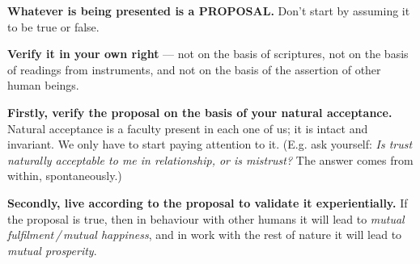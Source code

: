 \begin{abul}
\item \textbf{Whatever is being presented is a PROPOSAL.} Don't start by
      assuming it to be true or false.
\item \textbf{Verify it in your own right} --- not on the basis of scriptures,
      not on the basis of readings from instruments, and not on the basis of
      the assertion of other human beings.
\item \textbf{Firstly, verify the proposal on the basis of your natural
      acceptance.} Natural acceptance is a faculty present in each one of us;
      it is intact and invariant. We only have to start paying attention to
      it. (E.g. ask yourself: \emph{Is trust naturally acceptable to me in
      relationship, or is mistrust?} The answer comes from within,
      spontaneously.)
\item \textbf{Secondly, live according to the proposal to validate it
      experientially.} If the proposal is true, then in behaviour with other
      humans it will lead to \emph{mutual fulfilment\,/\,mutual happiness},
      and in work with the rest of nature it will lead to \emph{mutual
      prosperity}.
\end{abul}


